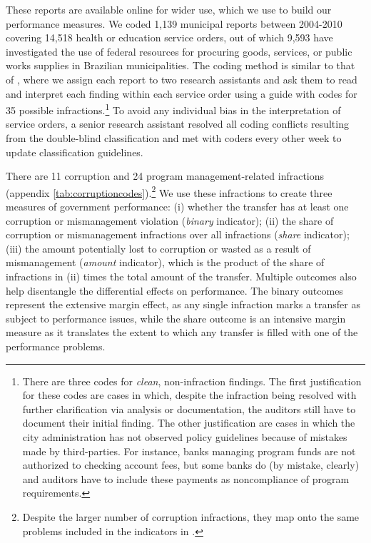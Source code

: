 \documentclass[11pt]{article}
\begin{document}
These reports are available online for wider use, which we use to build our performance measures. We coded 1,139 municipal reports between 2004-2010 covering 14,518 health or education service orders, out of which 9,593 have investigated the use of federal resources for procuring goods, services, or public works supplies in Brazilian municipalities. The coding method is similar to that of \citet{FerrazExposingCorruptPoliticians2008b}, where we assign each report to two research assistants and ask them to read and interpret each finding within each service order using a guide with codes for 35 possible infractions.\footnote{There are three codes for \emph{clean}, non-infraction findings. The first justification for these codes are cases in which, despite the infraction being resolved with further clarification via analysis or documentation, the auditors still have to document their initial finding. The other justification are cases in which the city administration has not observed policy guidelines because of mistakes made by third-parties. For instance, banks managing program funds are not authorized to checking account fees, but some banks do (by mistake, clearly) and auditors have to include these payments as noncompliance of program requirements.} To avoid any individual bias in the interpretation of service orders, a senior research assistant resolved all coding conflicts resulting from the double-blind classification and met with coders every other week to update classification guidelines.



There are 11 corruption and 24 program management-related infractions (appendix \ref{tab:corruptioncodes}).\footnote{Despite the larger number of corruption infractions, they map onto the same problems included in the indicators in \citet{FerrazExposingCorruptPoliticians2008b,FerrazElectoralAccountabilityCorruption2011a}.} We use these infractions to create three measures of government performance: (i) whether the transfer has at least one corruption or mismanagement violation (\emph{binary} indicator); (ii) the share of corruption or mismanagement infractions over all infractions (\emph{share} indicator); (iii) the amount potentially lost to corruption or wasted as a result of mismanagement (\emph{amount} indicator), which is the product of the share of infractions in (ii) times the total amount of the transfer. Multiple outcomes also help disentangle the differential effects on performance. The binary outcomes represent the extensive margin effect, as any single infraction marks a transfer as subject to performance issues, while the share outcome is an intensive margin measure as it translates the extent to which any transfer is filled with one of the performance problems.
\end{document}
